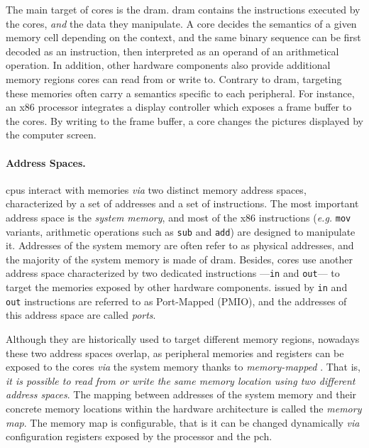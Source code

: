 The main target of cores \IOs is the \ac{dram}.
%
\ac{dram} contains the instructions executed by the cores, \emph{and} the data
they manipulate.
%
A core decides the semantics of a given memory cell depending on the context,
and the same binary sequence can be first decoded as an instruction, then
interpreted as an operand of an arithmetical operation.
%
In addition, other hardware components also provide additional memory regions
cores can read from or write to.
%
Contrary to \ac{dram}, \IOs targeting these memories often carry a semantics
specific to each peripheral.
%
For instance, an x86 processor integrates a display controller which exposes a
frame buffer to the cores.
%
By writing to the frame buffer, a core changes the pictures displayed by the
computer screen.

\paragraph{Address Spaces.}
%
\acp{cpu} interact with memories \emph{via} two distinct memory address spaces,
characterized by a set of addresses and a set of instructions.
%
The most important address space is the \emph{system memory}, and most of the
x86 instructions (\emph{e.g.} \texttt{mov} variants, arithmetic operations such
as \texttt{sub} and \texttt{add}) are designed to manipulate it.
%
Addresses of the system memory are often refer to as physical addresses, and the
majority of the system memory is made of \ac{dram}.
%
Besides, cores use another address space characterized by two dedicated
instructions ---\texttt{in} and \texttt{out}--- to target the memories exposed
by other hardware components.
%
\IOs issued by \texttt{in} and \texttt{out} instructions are referred to as
Port-Mapped \IOs (PMIO), and the addresses of this address space are called
\emph{ports}.

Although they are historically used to target different memory regions, nowadays
these two address spaces overlap, as peripheral memories and registers can be
exposed to the cores \emph{via} the system memory thanks to \emph{memory-mapped}
\IOs.
%
That is, \emph{it is possible to read from or write the same memory location
  using two different address spaces}.
%
%
%
The mapping between addresses of the system memory and their concrete memory
locations within the hardware architecture is called the \emph{memory map}.
%
The memory map is configurable, that is it can be changed dynamically \emph{via}
configuration registers exposed by the processor and the \ac{pch}.

